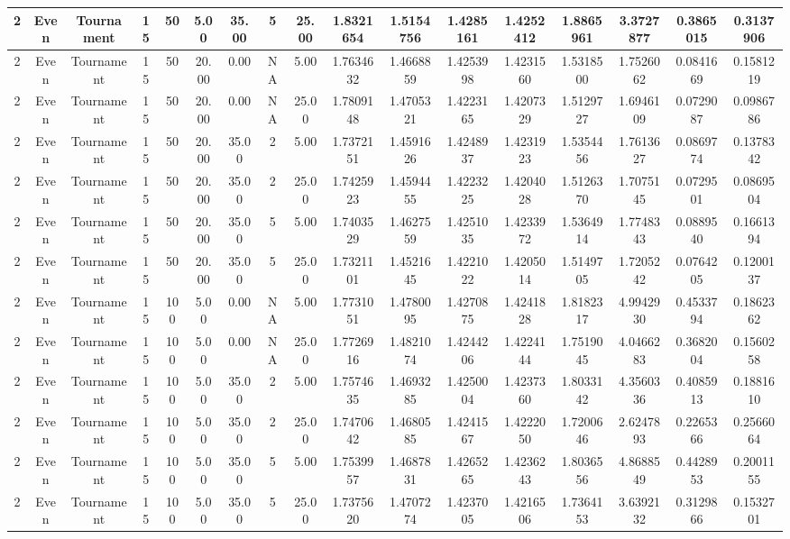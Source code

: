 \documentclass[a4paper]{article}
\begin{document}
\begin{center}
\begin{tabular}{ | c | c | c | c | c | c | c | c | c | c | c | c | c | c | c | c | c | }
		\hline
		2	&	Even	&	Tournament	&	15	&	50	&	5.00	&	35.00	&	5	&	25.00	&	1.8321654	&	1.5154756	&	1.4285161	&	1.4252412	&	1.8865961	&	3.3727877	&	0.3865015	&	0.3137906 \\
		\hline
		2	&	Even	&	Tournament	&	15	&	50	&	20.00	&	0.00	&	NA	&	5.00	&	1.7634632	&	1.4668859	&	1.4253998	&	1.4231560	&	1.5318500	&	1.7526062	&	0.0841669	&	0.1581219 \\
		\hline
		2	&	Even	&	Tournament	&	15	&	50	&	20.00	&	0.00	&	NA	&	25.00	&	1.7809148	&	1.4705321	&	1.4223165	&	1.4207329	&	1.5129727	&	1.6946109	&	0.0729087	&	0.0986786 \\
		\hline
		2	&	Even	&	Tournament	&	15	&	50	&	20.00	&	35.00	&	2	&	5.00	&	1.7372151	&	1.4591626	&	1.4248937	&	1.4231923	&	1.5354456	&	1.7613627	&	0.0869774	&	0.1378342 \\
		\hline
		2	&	Even	&	Tournament	&	15	&	50	&	20.00	&	35.00	&	2	&	25.00	&	1.7425923	&	1.4594455	&	1.4223225	&	1.4204028	&	1.5126370	&	1.7075145	&	0.0729501	&	0.0869504 \\
		\hline
		2	&	Even	&	Tournament	&	15	&	50	&	20.00	&	35.00	&	5	&	5.00	&	1.7403529	&	1.4627559	&	1.4251035	&	1.4233972	&	1.5364914	&	1.7748343	&	0.0889540	&	0.1661394 \\
		\hline
		2	&	Even	&	Tournament	&	15	&	50	&	20.00	&	35.00	&	5	&	25.00	&	1.7321101	&	1.4521645	&	1.4221022	&	1.4205014	&	1.5149705	&	1.7205242	&	0.0764205	&	0.1200137 \\
		\hline
		2	&	Even	&	Tournament	&	15	&	100	&	5.00	&	0.00	&	NA	&	5.00	&	1.7731051	&	1.4780095	&	1.4270875	&	1.4241828	&	1.8182317	&	4.9942930	&	0.4533794	&	0.1862362 \\
		\hline
		2	&	Even	&	Tournament	&	15	&	100	&	5.00	&	0.00	&	NA	&	25.00	&	1.7726916	&	1.4821074	&	1.4244206	&	1.4224144	&	1.7519045	&	4.0466283	&	0.3682004	&	0.1560258 \\
		\hline
		2	&	Even	&	Tournament	&	15	&	100	&	5.00	&	35.00	&	2	&	5.00	&	1.7574635	&	1.4693285	&	1.4250004	&	1.4237360	&	1.8033142	&	4.3560336	&	0.4085913	&	0.1881610 \\
		\hline
		2	&	Even	&	Tournament	&	15	&	100	&	5.00	&	35.00	&	2	&	25.00	&	1.7470642	&	1.4680585	&	1.4241567	&	1.4222050	&	1.7200646	&	2.6247893	&	0.2265366	&	0.2566064 \\
		\hline
		2	&	Even	&	Tournament	&	15	&	100	&	5.00	&	35.00	&	5	&	5.00	&	1.7539957	&	1.4687831	&	1.4265265	&	1.4236243	&	1.8036556	&	4.8688549	&	0.4428953	&	0.2001155 \\
		\hline
		2	&	Even	&	Tournament	&	15	&	100	&	5.00	&	35.00	&	5	&	25.00	&	1.7375620	&	1.4707274	&	1.4237005	&	1.4216506	&	1.7364153	&	3.6392132	&	0.3129866	&	0.1532701 \\

\end{tabular}
\end{center}
\end{document}
